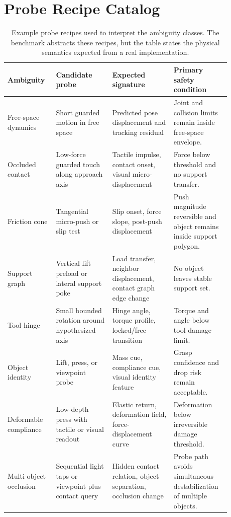 \documentclass{article}
\begin{document}
\section{Probe Recipe Catalog}

\begin{table}[p]
\centering
\small
\begin{tabular}{p{0.18\linewidth}p{0.23\linewidth}p{0.25\linewidth}p{0.22\linewidth}}
\toprule
Ambiguity & Candidate probe & Expected signature & Primary safety condition \\
\midrule
Free-space dynamics & Short guarded motion in free space & Predicted pose displacement and tracking residual & Joint and collision limits remain inside free-space envelope. \\
Occluded contact & Low-force guarded touch along approach axis & Tactile impulse, contact onset, visual micro-displacement & Force below threshold and no support transfer. \\
Friction cone & Tangential micro-push or slip test & Slip onset, force slope, post-push displacement & Push magnitude reversible and object remains inside support polygon. \\
Support graph & Vertical lift preload or lateral support poke & Load transfer, neighbor displacement, contact graph edge change & No object leaves stable support set. \\
Tool hinge & Small bounded rotation around hypothesized axis & Hinge angle, torque profile, locked/free transition & Torque and angle below tool damage limit. \\
Object identity & Lift, press, or viewpoint probe & Mass cue, compliance cue, visual identity feature & Grasp confidence and drop risk remain acceptable. \\
Deformable compliance & Low-depth press with tactile or visual readout & Elastic return, deformation field, force-displacement curve & Deformation below irreversible damage threshold. \\
Multi-object occlusion & Sequential light taps or viewpoint plus contact query & Hidden contact relation, object separation, occlusion change & Probe path avoids simultaneous destabilization of multiple objects. \\
\bottomrule
\end{tabular}
\caption{Example probe recipes used to interpret the ambiguity classes. The benchmark abstracts these recipes, but the table states the physical semantics expected from a real implementation.}
\label{tab:probe_recipes}
\end{table}
\end{document}

